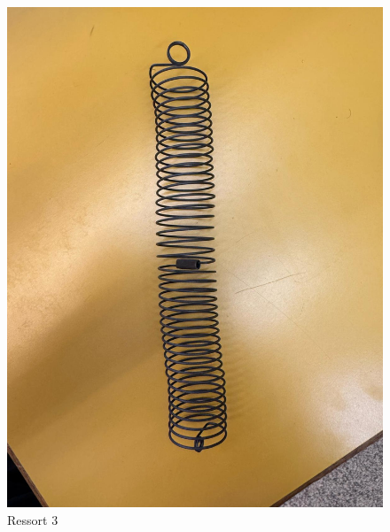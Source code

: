 \begin{figure}[h]
\begin{minipage}{0.32\textwidth}
                    \includegraphics[width=\linewidth]{images/res3.jpeg}
                    \caption{Ressort 3}
                \end{minipage}
            \end{figure}
